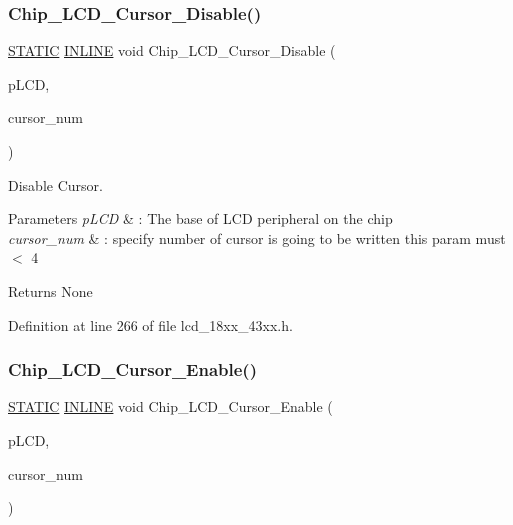 \subsubsection{\texorpdfstring{Chip\+\_\+\+L\+C\+D\+\_\+\+Cursor\+\_\+\+Disable()}{Chip\_LCD\_Cursor\_Disable()}}
{\footnotesize\ttfamily \hyperlink{group___l_p_c___types___public___macros_ga10b2d890d871e1489bb02b7e70d9bdfb}{S\+T\+A\+T\+IC} \hyperlink{spifi__18xx__43xx_8h_a2eb6f9e0395b47b8d5e3eeae4fe0c116}{I\+N\+L\+I\+NE} void Chip\+\_\+\+L\+C\+D\+\_\+\+Cursor\+\_\+\+Disable (\begin{DoxyParamCaption}\item[{\hyperlink{struct_l_p_c___l_c_d___t}{L\+P\+C\+\_\+\+L\+C\+D\+\_\+T} $\ast$}]{p\+L\+CD,  }\item[{uint8\+\_\+t}]{cursor\+\_\+num }\end{DoxyParamCaption})}



Disable Cursor. 


\begin{DoxyParams}{Parameters}
{\em p\+L\+CD} & \+: The base of L\+CD peripheral on the chip \\
\hline
{\em cursor\+\_\+num} & \+: specify number of cursor is going to be written this param must $<$ 4 \\
\hline
\end{DoxyParams}
\begin{DoxyReturn}{Returns}
None 
\end{DoxyReturn}


Definition at line 266 of file lcd\+\_\+18xx\+\_\+43xx.\+h.

\mbox{\label{group___l_c_d__18_x_x__43_x_x_ga70b227f6b0291dda72ec239ec34466a0}} 
\subsubsection{\texorpdfstring{Chip\+\_\+\+L\+C\+D\+\_\+\+Cursor\+\_\+\+Enable()}{Chip\_LCD\_Cursor\_Enable()}}
{\footnotesize\ttfamily \hyperlink{group___l_p_c___types___public___macros_ga10b2d890d871e1489bb02b7e70d9bdfb}{S\+T\+A\+T\+IC} \hyperlink{spifi__18xx__43xx_8h_a2eb6f9e0395b47b8d5e3eeae4fe0c116}{I\+N\+L\+I\+NE} void Chip\+\_\+\+L\+C\+D\+\_\+\+Cursor\+\_\+\+Enable (\begin{DoxyParamCaption}\item[{\hyperlink{struct_l_p_c___l_c_d___t}{L\+P\+C\+\_\+\+L\+C\+D\+\_\+T} $\ast$}]{p\+L\+CD,  }\item[{uint8\+\_\+t}]{cursor\+\_\+num }\end{DoxyParamCaption})}



